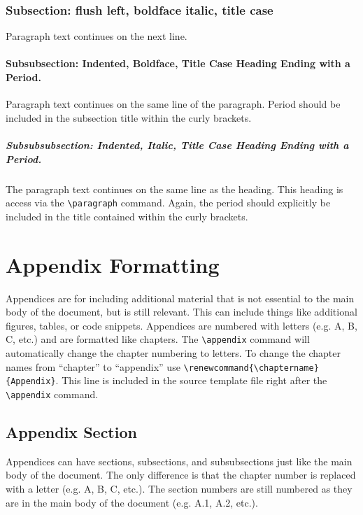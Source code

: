 \documentclass{thesis-dissertation}
\begin{document}
\subsection{Subsection: flush left, boldface italic, title case}
Paragraph text continues on the next line.

\subsubsection{Subsubsection: Indented, Boldface, Title Case Heading Ending with a Period.}
Paragraph text continues on the same line of the paragraph. Period should be included in the subsection title within the curly brackets.

\paragraph{Subsubsubsection: Indented, Italic, Title Case Heading Ending with a Period.} The paragraph text continues on the same line as the heading. This heading is access via the \verb|\paragraph| command. Again, the period should explicitly be included in the title contained within the curly brackets.

\printbibliography{}

\appendix
\renewcommand\chaptername{Appendix} %
\chapter{Appendix Formatting}
Appendices are for including additional material that is not essential to the main body of the document, but is still relevant. This can include things like additional figures, tables, or code snippets. Appendices are numbered with letters (e.g. A, B, C, etc.) and are formatted like chapters. The \verb|\appendix| command will automatically change the chapter numbering to letters. To change the chapter names from ``chapter'' to ``appendix'' use \verb|\renewcommand{\chaptername}{Appendix}|. This line is included in the source template file right after the \verb|\appendix| command.
\section{Appendix Section}
Appendices can have sections, subsections, and subsubsections just like the main body of the document. The only difference is that the chapter number is replaced with a letter (e.g. A, B, C, etc.). The section numbers are still numbered as they are in the main body of the document (e.g. A.1, A.2, etc.).
\end{document}
